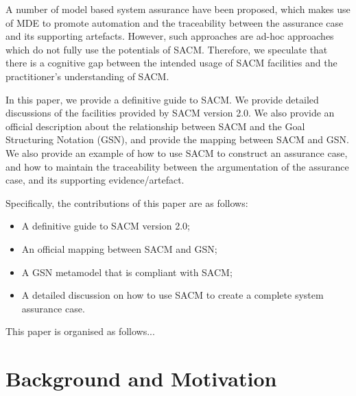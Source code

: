 A number of model based system assurance have been proposed, which makes use of MDE to promote automation and the traceability between the assurance case and its supporting artefacts. However, such approaches are ad-hoc approaches which do not fully use the potentials of SACM. Therefore, we speculate that there is a cognitive gap between the intended usage of SACM facilities and the practitioner's understanding of SACM. 

In this paper, we provide a definitive guide to SACM. We provide detailed discussions of the facilities provided by SACM version 2.0. We also provide an official description about the relationship between SACM and the Goal Structuring Notation (GSN), and provide the mapping between SACM and GSN. We also provide an example of how to use SACM to construct an assurance case, and how to maintain the traceability between the argumentation of the assurance case, and its supporting evidence/artefact.

Specifically, the contributions of this paper are as follows:
\begin{itemize}
	\item A definitive guide to SACM version 2.0;
	\item An official mapping between SACM and GSN;
	\item A GSN metamodel that is compliant with SACM;
	\item A detailed discussion on how to use SACM to create a complete system assurance case.
\end{itemize}

This paper is organised as follows...

\section{Background and Motivation}

